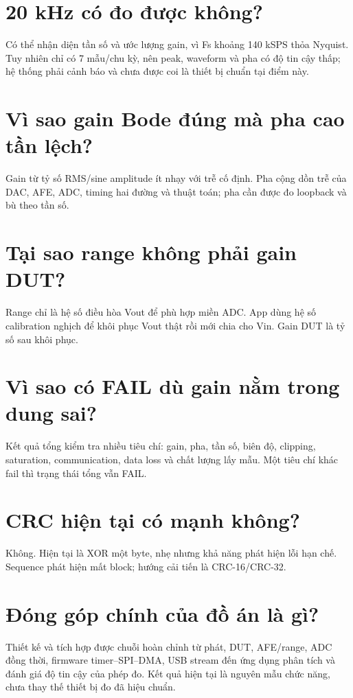 \documentclass[12pt,a4paper,oneside]{article}
\begin{document}
\section{20 kHz có đo được không?}

Có thể nhận diện tần số và ước lượng gain, vì Fs khoảng 140 kSPS thỏa Nyquist. Tuy nhiên chỉ có 7 mẫu/chu kỳ, nên peak, waveform và pha có độ tin cậy thấp; hệ thống phải cảnh báo và chưa được coi là thiết bị chuẩn tại điểm này.

\section{Vì sao gain Bode đúng mà pha cao tần lệch?}

Gain từ tỷ số RMS/sine amplitude ít nhạy với trễ cố định. Pha cộng dồn trễ của DAC, AFE, ADC, timing hai đường và thuật toán; pha cần được đo loopback và bù theo tần số.

\section{Tại sao range không phải gain DUT?}

Range chỉ là hệ số điều hòa Vout để phù hợp miền ADC. App dùng hệ số calibration nghịch để khôi phục Vout thật rồi mới chia cho Vin. Gain DUT là tỷ số sau khôi phục.

\section{Vì sao có FAIL dù gain nằm trong dung sai?}

Kết quả tổng kiểm tra nhiều tiêu chí: gain, pha, tần số, biên độ, clipping, saturation, communication, data loss và chất lượng lấy mẫu. Một tiêu chí khác fail thì trạng thái tổng vẫn FAIL.

\section{CRC hiện tại có mạnh không?}

Không. Hiện tại là XOR một byte, nhẹ nhưng khả năng phát hiện lỗi hạn chế. Sequence phát hiện mất block; hướng cải tiến là CRC-16/CRC-32.

\section{Đóng góp chính của đồ án là gì?}

Thiết kế và tích hợp được chuỗi hoàn chỉnh từ phát, DUT, AFE/range, ADC đồng thời, firmware timer–SPI–DMA, USB stream đến ứng dụng phân tích và đánh giá độ tin cậy của phép đo. Kết quả hiện tại là nguyên mẫu chức năng, chưa thay thế thiết bị đo đã hiệu chuẩn.
\end{document}
